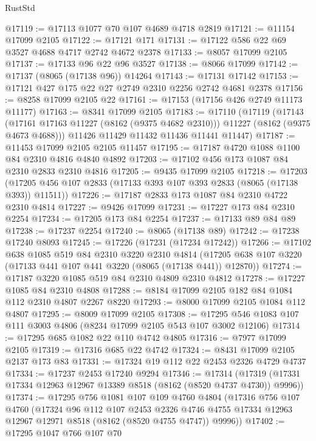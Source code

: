 \begin{lexlean}{RustStd}
\begin{coremodule}
@17119 := @17113 @1077 @70 @107 @4689 @4718 @2819
@17121 := @11154 @17099 @2105
@17122 := @17121 @171
@17131 := @17122 @586 @22 @69 @3527 @4688 @4717 @2742 @4672 @2378
@17133 := @8057 @17099 @2105
@17137 := @17133 @96 @22 @96 @3527
@17138 := @8066 @17099
@17142 := @17137 (@8065 (@17138 @96)) @14264
@17143 := @17131 @17142
@17153 := @17121 @427 @175 @22 @27 @2749 @2310 @2256 @2742 @4681 @2378
@17156 := @8258 @17099 @2105 @22
@17161 := @17153 (@17156 @426 @2749 @11173 @11177)
@17163 := @8341 @17099 @2105
@17183 := @17110
    (@17119
      (@17143 (@17161 @17163 @11227 (@8162 (@9375 @4682 @2310))) @11227 (@8162 (@9375 @4673 @4688)))
      @11426
      @11429
      @11432
      @11436
      @11441
      @11447)
@17187 := @11453 @17099 @2105 @2105 @11457
@17195 := @17187 @4720 @1088 @1100 @84 @2310 @4816 @4840 @4892
@17203 := @17102 @456 @173 @1087 @84 @2310 @2833 @2310 @4816
@17205 := @9435 @17099 @2105
@17218 := @17203 (@17205 @456 @107 @2833 (@17133 @393 @107 @393 @2833 (@8065 (@17138 @393)) @11511))
@17226 := @17187 @2833 @173 @1087 @84 @2310 @4722 @2310 @4814
@17227 := @9426 @17099
@17231 := @17227 @173 @84 @2310 @2254
@17234 := @17205 @173 @84 @2254
@17237 := @17133 @89 @84 @89
@17238 := @17237 @2254
@17240 := @8065 (@17138 @89)
@17242 := @17238 @17240 @8093
@17245 := @17226 (@17231 (@17234 @17242))
@17266 := @17102
    @638
    @1085
    @519
    @84
    @2310
    @3220
    @2310
    @4814
    (@17205 @638 @107 @3220 (@17133 @441 @107 @441 @3220 (@8065 (@17138 @441)) @12870))
@17274 := @17187 @3220 @1085 @519 @84 @2310 @4809 @2310 @4812
@17278 := @17227 @1085 @84 @2310 @4808
@17288 := @8184 @17099 @2105 @182 @84 @1084 @112 @2310 @4807 @2267 @8220
@17293 := @8000 @17099 @2105 @1084 @112 @4807
@17295 := @8009 @17099 @2105
@17308 := @17295 @546 @1083 @107 @111 @3003 @4806 (@8234 @17099 @2105 @543 @107 @3002 @12106)
@17314 := @17295 @685 @1082 @22 @110 @4742 @4805
@17316 := @7977 @17099 @2105
@17319 := @17316 @685 @22 @4742
@17324 := @8431 @17099 @2105 @2137 @173 @83
@17331 := @17324 @19 @112 @22 @2453 @2326 @4729 @4737
@17334 := @17237 @2453 @17240 @9294
@17346 := @17314
    (@17319 (@17331 @17334 @12963 @12967 @13389 @8518 (@8162 (@8520 @4737 @4730)) @9996))
@17374 := @17295
    @756
    @1081
    @107
    @109
    @4760
    @4804
    (@17316
      @756
      @107
      @4760
      (@17324
        @96
        @112
        @107
        @2453
        @2326
        @4746
        @4755
        @17334
        @12963
        @12967
        @12971
        @8518
        (@8162 (@8520 @4755 @4747))
        @9996))
@17402 := @17295
    @1047
    @766
    @107
    @70

\end{coremodule}
\end{lexlean}
